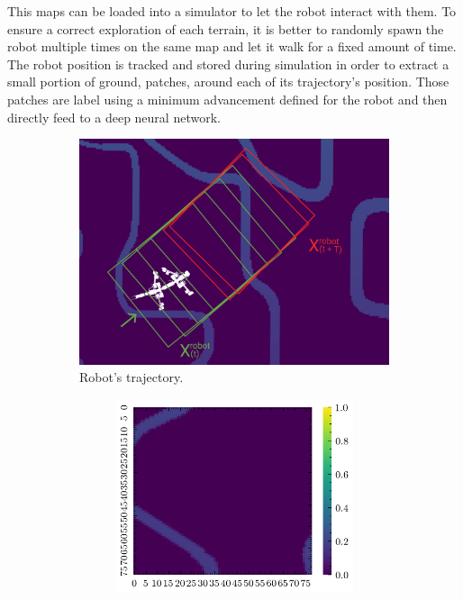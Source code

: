 \documentclass[../document.tex]{subfiles}
\begin{document}
This maps can be loaded into a simulator to let the robot interact with them. To ensure a correct exploration of each terrain, it is better to randomly spawn the robot multiple times on the same map and let it walk for a fixed amount of time. The robot position is tracked and stored during simulation in order to extract a small portion of ground, patches, around each of its trajectory's position. Those patches are label using a minimum advancement defined for the robot and then directly feed to a deep neural network. 
\begin{figure}[H]
    \centering
    \begin{subfigure}[b]{1\textwidth}
    \includegraphics[width=\textwidth]{../img/krock-bars-correct-small.png}
    \caption{Robot's trajectory.}
\end{subfigure}
\begin{subfigure}[b]{1\textwidth}
    \begin{subfigure}[b]{0.19\textwidth}
    \includegraphics[width=\linewidth]{../img/bars1-example-patches/2d/0.png}

\end{subfigure}
\end{subfigure}
\end{figure}
\end{document}
